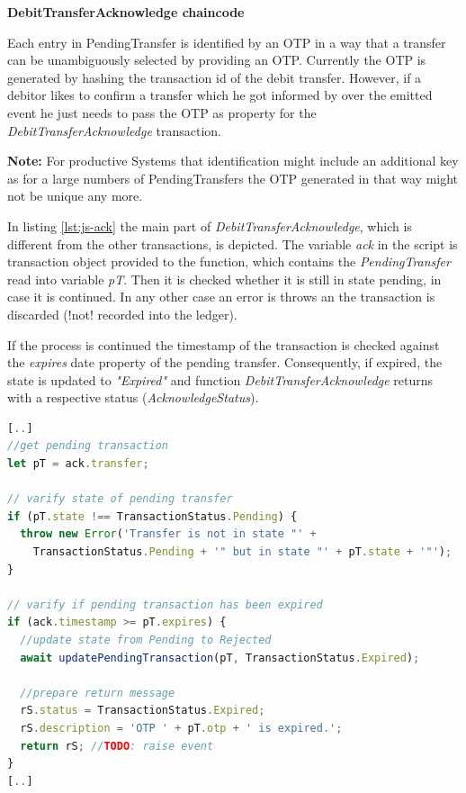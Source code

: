 \textbf{DebitTransferAcknowledge chaincode}

Each entry in PendingTransfer is identified by an OTP in a way that a transfer can be unambiguously selected by providing an OTP. Currently the OTP is generated by hashing the transaction id of the debit transfer. However, if a debitor likes to confirm a transfer which he got informed by over the emitted event he just needs to pass the OTP as property for the \textit{DebitTransferAcknowledge} transaction.

\textbf{Note:} For productive Systems that identification might include an additional key as for a large numbers of PendingTransfers the OTP generated in that way might not be unique any more.

In listing \ref{lst:js-ack} the main part of \textit{DebitTransferAcknowledge}, which is different from the other transactions, is depicted. The variable \textit{ack} in the script is transaction object provided to the function, which contains the \textit{PendingTransfer} read into variable \textit{pT}. Then it is checked whether it is still in state pending, in case it is continued. In any other case an error is throws an the transaction is discarded (!not! recorded into the ledger).

If the process is continued the timestamp of the transaction is checked against the \textit{expires} date property of the pending transfer. Consequently, if expired, the state is updated to \textit{"Expired"} and function \textit{DebitTransferAcknowledge} returns with a respective status (\textit{AcknowledgeStatus}).

\begin{center}
\begin{minipage}{0.8\textwidth}
\small
\begin{lstlisting}[language=javascript,firstnumber=1,caption={\bf\small RequestDebitAcknowledge JavaScript excerpt}, captionpos=b,label=lst:js-ack]
[..]
//get pending transaction
let pT = ack.transfer;

// varify state of pending transfer
if (pT.state !== TransactionStatus.Pending) {
  throw new Error('Transfer is not in state "' +
    TransactionStatus.Pending + '" but in state "' + pT.state + '"');
}

// varify if pending transaction has been expired
if (ack.timestamp >= pT.expires) {
  //update state from Pending to Rejected
  await updatePendingTransaction(pT, TransactionStatus.Expired);

  //prepare return message
  rS.status = TransactionStatus.Expired;
  rS.description = 'OTP ' + pT.otp + ' is expired.';
  return rS; //TODO: raise event
}
[..]
\end{lstlisting}
\end{minipage}
\end{center}

